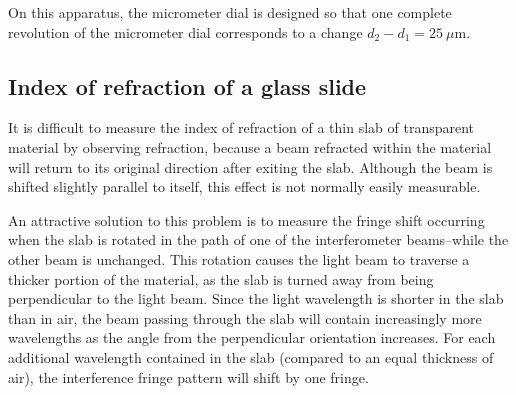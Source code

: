 On this apparatus, the micrometer dial is designed so that one 
complete revolution of the micrometer dial corresponds to a change 
$d_{2} - d_{1} = 25~\mu$m.

%



\subsection{Index of refraction of a glass slide}

It is difficult to measure the index of refraction of a thin slab of transparent
material by observing refraction, because a beam refracted within the material
will return to its original direction after exiting the slab. Although the beam is
shifted slightly parallel to itself, this effect is not normally easily
measurable. 

An attractive solution to this problem is to measure the fringe shift occurring
when the slab is rotated in the path of one of the interferometer beams--while
the other beam is unchanged.  This rotation causes the light beam to traverse a
thicker portion of the material, as the slab is turned away from being
perpendicular to the light beam. Since the light wavelength is shorter in the
slab than in air, the beam passing through the slab will contain
increasingly more wavelengths as the angle from the perpendicular orientation
increases. For each additional wavelength contained in the slab (compared to an
equal thickness of air), the interference fringe pattern will shift by one
fringe.

